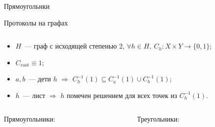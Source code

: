 \begin{frame}{Прямоугольнки}
    
\end{frame}



\begin{frame}{Протоколы на графах}
    \vspace{-0.8cm}
    \begin{columns}[t]
        \begin{column}{0.58\textwidth}
            \begin{itemize}
                \item $H$~--- граф с исходящей степенью $2$, $\forall h \in H, ~ C_h: X \times Y \to
                    \{0, 1\}$;
                \item $C_{root} \equiv 1$;
                \item $a, b$~--- дети $h$ $\Rightarrow$ $C_{h}^{-1}(1) \subseteq C_{a}^{-1}(1)
                    \cup C_{b}^{-1}(1)$;
                \item $h$~--- лист $\Rightarrow$ $h$ помечен решением для всех точек из $C_h^{-1}(1)$.
            \end{itemize}
        \end{column}

		\begin{column}{0.38\textwidth}
            \begin{center}
                
            \end{center}
		\end{column}
	\end{columns}

    \pause
    \begin{columns}[t]
		\begin{column}{0.48\textwidth}
            \begin{center}
                Прямоугольники:
                \vspace{0.2cm}
                
            \end{center}
        \end{column}

		\begin{column}{0.48\textwidth}
            \begin{center}
                Треугольники:
                \vspace{0.2cm}
                
            \end{center}
		\end{column}
	\end{columns}
\end{frame}


